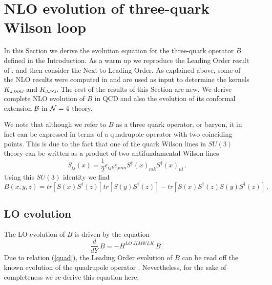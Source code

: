 \documentclass[11pt,a4paper]{article}
\def\beq{\begin{equation}}
\def\eeq{\end{equation}}
\def\beq{\begin{equation}}
\def\eeq{\end{equation}}
\begin{document}
 
 

\section{NLO evolution of three-quark Wilson loop}

In this Section we derive the evolution equation for the three-quark operator $B$ defined in the Introduction.  As a warm up we reproduce the Leading Order result of \cite{GrabLO}, and then consider the Next to Leading Order.  As explained above, some of the NLO results were computed in \cite{Grab} and are used as input to determine
the kernels $K_{JJSSJ}$ and $K_{JJSJ}$.  The rest of the results of this Section are new. We derive complete NLO evolution of $B$ in QCD
and also the evolution of its conformal extension $\cal B$ in ${\cal N}=4 $ theory.

We note that although we refer to $B$ as a three quark operator, or baryon, it in fact can be expressed in terms of a quadrupole operator with two coinciding points. This is due to the fact that one of the quark Wilson lines in $SU(3)$ theory can be written as a product of two antifundamental Wilson lines
\begin{equation}
S_{ij}(x)=\frac{1}{2}\epsilon_{ijk}\epsilon_{jmn}S^\dagger(x)_{mk}S^\dagger(x)_{nl}\,.
\end{equation}
Using this $SU(3)$ identity we find
\beq\label{quad}
B(x,y,z)=tr[S(x)S^\dagger(z)]tr[S(y)S^\dagger(z)]-tr[S(x)S^\dagger(z)S(y)S^\dagger(z)]\,.
\eeq


\subsection{LO evolution}

The LO evolution of $B$ is driven by the equation 
\beq
\frac{d}{dY}\,B=-H^{LO\,JIMWLK}\,B\,.
\eeq
Due to relation (\ref{quad}), the Leading Order evolution of $B$ can be read off the known evolution of the quadrupole operator \cite{quadrupole1,quadrupole2}. 
Nevertheless, for the sake of completeness we re-derive this equation here.
\end{document}
